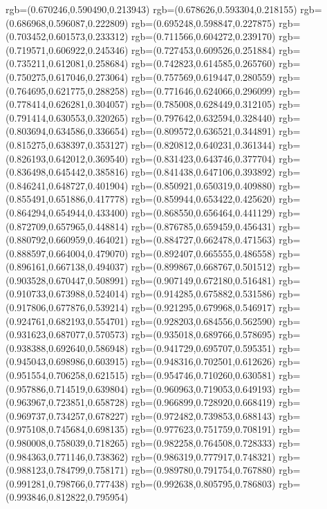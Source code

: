 {{{			rgb=(0.670246,0.590490,0.213943)
			rgb=(0.678626,0.593304,0.218155)
			rgb=(0.686968,0.596087,0.222809)
			rgb=(0.695248,0.598847,0.227875)
			rgb=(0.703452,0.601573,0.233312)
			rgb=(0.711566,0.604272,0.239170)
			rgb=(0.719571,0.606922,0.245346)
			rgb=(0.727453,0.609526,0.251884)
			rgb=(0.735211,0.612081,0.258684)
			rgb=(0.742823,0.614585,0.265760)
			rgb=(0.750275,0.617046,0.273064)
			rgb=(0.757569,0.619447,0.280559)
			rgb=(0.764695,0.621775,0.288258)
			rgb=(0.771646,0.624066,0.296099)
			rgb=(0.778414,0.626281,0.304057)
			rgb=(0.785008,0.628449,0.312105)
			rgb=(0.791414,0.630553,0.320265)
			rgb=(0.797642,0.632594,0.328440)
			rgb=(0.803694,0.634586,0.336654)
			rgb=(0.809572,0.636521,0.344891)
			rgb=(0.815275,0.638397,0.353127)
			rgb=(0.820812,0.640231,0.361344)
			rgb=(0.826193,0.642012,0.369540)
			rgb=(0.831423,0.643746,0.377704)
			rgb=(0.836498,0.645442,0.385816)
			rgb=(0.841438,0.647106,0.393892)
			rgb=(0.846241,0.648727,0.401904)
			rgb=(0.850921,0.650319,0.409880)
			rgb=(0.855491,0.651886,0.417778)
			rgb=(0.859944,0.653422,0.425620)
			rgb=(0.864294,0.654944,0.433400)
			rgb=(0.868550,0.656464,0.441129)
			rgb=(0.872709,0.657965,0.448814)
			rgb=(0.876785,0.659459,0.456431)
			rgb=(0.880792,0.660959,0.464021)
			rgb=(0.884727,0.662478,0.471563)
			rgb=(0.888597,0.664004,0.479070)
			rgb=(0.892407,0.665555,0.486558)
			rgb=(0.896161,0.667138,0.494037)
			rgb=(0.899867,0.668767,0.501512)
			rgb=(0.903528,0.670447,0.508991)
			rgb=(0.907149,0.672180,0.516481)
			rgb=(0.910733,0.673988,0.524014)
			rgb=(0.914285,0.675882,0.531586)
			rgb=(0.917806,0.677876,0.539214)
			rgb=(0.921295,0.679968,0.546917)
			rgb=(0.924761,0.682193,0.554701)
			rgb=(0.928203,0.684556,0.562590)
			rgb=(0.931623,0.687077,0.570573)
			rgb=(0.935018,0.689766,0.578695)
			rgb=(0.938388,0.692640,0.586948)
			rgb=(0.941729,0.695707,0.595351)
			rgb=(0.945043,0.698986,0.603915)
			rgb=(0.948316,0.702501,0.612626)
			rgb=(0.951554,0.706258,0.621515)
			rgb=(0.954746,0.710260,0.630581)
			rgb=(0.957886,0.714519,0.639804)
			rgb=(0.960963,0.719053,0.649193)
			rgb=(0.963967,0.723851,0.658728)
			rgb=(0.966899,0.728920,0.668419)
			rgb=(0.969737,0.734257,0.678227)
			rgb=(0.972482,0.739853,0.688143)
			rgb=(0.975108,0.745684,0.698135)
			rgb=(0.977623,0.751759,0.708191)
			rgb=(0.980008,0.758039,0.718265)
			rgb=(0.982258,0.764508,0.728333)
			rgb=(0.984363,0.771146,0.738362)
			rgb=(0.986319,0.777917,0.748321)
			rgb=(0.988123,0.784799,0.758171)
			rgb=(0.989780,0.791754,0.767880)
			rgb=(0.991281,0.798766,0.777438)
			rgb=(0.992638,0.805795,0.786803)
			rgb=(0.993846,0.812822,0.795954)
}}}
